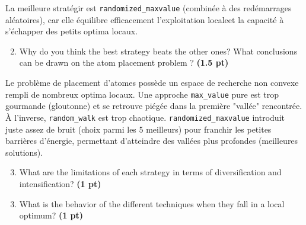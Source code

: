 \documentclass[11pt,a4paper]{report}
\begin{document}
\begin{answers}[3.5cm]
La meilleure stratégir est \texttt{randomized\_maxvalue} (combinée à des redémarrages aléatoires), car elle  équilibre efficacement l'exploitation localeet la capacité à s'échapper des petits optima locaux.
\end{answers}


\newpage
\begin{enumerate}
\setcounter{enumi}{3}
\begin{enumerate}
\setcounter{enumii}{1}
    \item Why do you think the best strategy beats the other ones? What conclusions can be drawn on the atom placement problem ? \textbf{(1.5 pt)}
\end{enumerate}
\end{enumerate}

\begin{answers}[7.5cm]
Le problème de placement d'atomes possède un espace de recherche non convexe rempli de nombreux optima locaux. Une approche \texttt{max\_value} pure est trop gourmande (gloutonne) et se retrouve piégée dans la première  "vallée" rencontrée. À l'inverse, \texttt{random\_walk} est trop chaotique. \texttt{randomized\_maxvalue} introduit juste assez de bruit (choix parmi les 5 meilleurs) pour franchir les petites  barrières d'énergie, permettant  d'atteindre des vallées plus profondes (meilleures solutions).
\end{answers}



\begin{enumerate}
\setcounter{enumi}{3}
\begin{enumerate}
\setcounter{enumii}{2}
    \item What are the limitations of each strategy in terms of diversification 
    and intensification? \textbf{(1 pt)}
\end{enumerate}
\end{enumerate}

\begin{answers}[5cm]
\beg
\end{answers}



\begin{enumerate}
\setcounter{enumi}{3}
\begin{enumerate}
\setcounter{enumii}{2}
    \item What is the behavior of the different techniques when they fall 
    in a local optimum? \textbf{(1 pt)}
\end{enumerate}
\end{enumerate}
\end{document}
